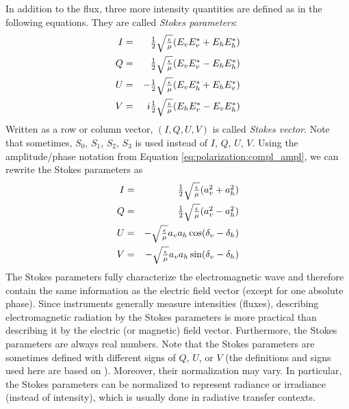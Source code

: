 In addition to the flux, three more intensity quantities
are defined as in the following equations. They are called 
\emph{Stokes parameters}:
\begin{eqnarray}
  \label{eq:polarization:stokesparam_I}
  I &=& \textstyle\frac{1}{2}\sqrt{\textstyle{\frac{\epsilon}{\mu}}} ( E_v E_v^\ast + E_h E_h^\ast ) \\
  \label{eq:polarization:stokesparam_Q}
  Q &=&  \textstyle\frac{1}{2}\sqrt{\textstyle{\frac{\epsilon}{\mu}}} (  E_v E_v^\ast - E_h E_h^\ast ) \\
  \label{eq:polarization:stokesparam_U}
  U &=& - \textstyle\frac{1}{2}\sqrt{\textstyle{\frac{\epsilon}{\mu}}} (  E_v E_h^\ast + E_h E_v^\ast ) \\
  \label{eq:polarization:stokesparam_V}
  V &=& i \textstyle\frac{1}{2}\sqrt{\textstyle{\frac{\epsilon}{\mu}}} (E_h E_v^\ast - E_v E_h^\ast )
\end{eqnarray}
Written as a row or column vector, $(I,Q,U,V)$ is called
\emph{Stokes vector}. Note that sometimes, $S_0$, $S_1$, $S_2$, $S_3$
is used instead of $I$, $Q$, $U$, $V$.
Using the amplitude/phase notation from
Equation \ref{eq:polarization:compl_ampl},
we can rewrite the Stokes parameters as 
\begin{eqnarray}
  \label{eq:polarization:stokesparam_alt_I}
 I &=&  \textstyle\frac{1}{2}\sqrt{\textstyle{\frac{\epsilon}{\mu}}} (a_v^2 + a_h^2)\\
  \label{eq:polarization:stokesparam_alt_Q}
 Q &=& \textstyle\frac{1}{2}\sqrt{\textstyle{\frac{\epsilon}{\mu}}} (a_v^2 - a_h^2)\\
  \label{eq:polarization:stokesparam_alt_U}
 U &=&  - \sqrt{\textstyle{\frac{\epsilon}{\mu}}} a_v a_h \cos(\delta_v-\delta_h)\\
  \label{eq:polarization:stokesparam_alt_V}
 V &=&   - \sqrt{\textstyle{\frac{\epsilon}{\mu}}}  a_v a_h \sin(\delta_v-\delta_h)
\end{eqnarray}
The Stokes parameters fully characterize the electromagnetic wave and
therefore contain the same information as the electric field vector
(except for one absolute phase).  Since instruments generally measure
intensities (fluxes), describing electromagnetic radiation by the
Stokes parameters is more practical than describing it by the electric
(or magnetic) field vector. Furthermore, the Stokes parameters are
always real numbers.  Note that the Stokes parameters are sometimes
defined with different signs of $Q$, $U$, or $V$ (the definitions and
signs used here are based on
\citet{mishchenko00:_light_scatt_nonsp_partic}). Moreover, their
normalization may vary. In particular, the Stokes parameters can be
normalized to represent radiance or irradiance (instead of intensity),
which is usually done in radiative transfer contexts.
 
